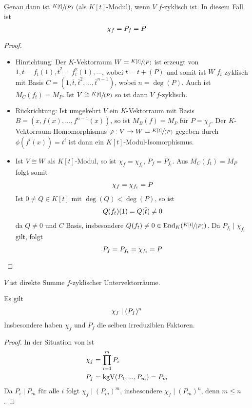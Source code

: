 \begin{proposition}
	Genau dann ist $\sfrac{K[t]}{(P)}$ (als $K[t]$-Modul), wenn $V$ $f$-zyklisch ist. In diesem Fall ist
	\begin{align}
		\chi_f=P_f=P\notag
	\end{align}
\end{proposition}
\begin{proof}
	\begin{itemize}
		\item Hinrichtung: Der $K$-Vektorraum $W=\sfrac{K[t]}{(P)}$ ist erzeugt von $1,\overline{t}=f_t(1),\overline{t}^2=f^2_t(1),...$, wobei $\overline{t}=t+(P)$ und somit ist $W$ $f_t$-zyklisch mit Basis $C=(1,\overline{t},\overline{t}^2,...,\overline{t}^{n-1})$, wobei $n=\deg(P)$. Auch ist $M_C(f_t)=M_P$. Ist $V\cong\sfrac{K[t]}{(P)}$ so ist dann $V$ $f$-zyklisch.
		\item Rückrichtung: Ist umgekehrt $V$ ein $K$-Vektorraum mit Basis $B=(x,f(x),...,f^{n-1}(x))$, so ist $M_B(f)=M_P$ für $P=\chi_f$. Der $K$-Vektorraum-Homomorphismus $\varphi:V\to W=\sfrac{K[t]}{(P)}$ gegeben durch $\phi(f^i(x))=t^i$ ist dann ein $K[t]$-Modul-Isomorphismus.
		\item Ist $V\cong W$ als $K[t]$-Modul, so ist $\chi_f=\chi_{f_t}$, $P_f=P_{f_t}$. Aus $M_C(f_t)=M_P$ folgt somit 
		\begin{align}
			\chi_f=\chi_{f_t}=P\notag
		\end{align}
		Ist $0\neq Q\in K[t]$ mit $\deg(Q)<\deg(P)$, so ist
		\begin{align}
			Q(f_t)(1)=Q(\overline{t})\neq 0\notag
		\end{align}
		da $Q\neq 0$ und $C$ Basis, insbesondere $Q(f_t)\neq 0\in\operatorname{End}_K(\sfrac{K[t]}{(P)})$. Da $P_{f_t}\mid \chi_{f_t}$ gilt, folgt 
		\begin{align}
			P_f=P_{f_t}=\chi_{f_t}=P\notag
		\end{align}
	\end{itemize}
\end{proof}

\begin{conclusion}
	$V$ ist direkte Summe $f$-zyklischer Untervektorräume.
\end{conclusion}

\begin{conclusion}
	Es gilt
	\begin{align}
		\chi_f\mid (P_f)^n\notag
	\end{align}
	Insbesondere haben $\chi_f$ und $P_f$ die selben irreduziblen Faktoren.
\end{conclusion}
\begin{proof}
	In der Situation von  ist
	\begin{align}
		\chi_f &= \prod_{i=1}^m P_i\notag \\
		P_f &= \operatorname{kgV}(P_1,...,P_m)=P_m\notag
	\end{align}
	Da $P_i\mid P_m$ für alle $i$ folgt $\chi_f\mid (P_m)^m$, insbesondere $\chi_f\mid (P_m)^n$, denn $m\le n$.
\end{proof}

